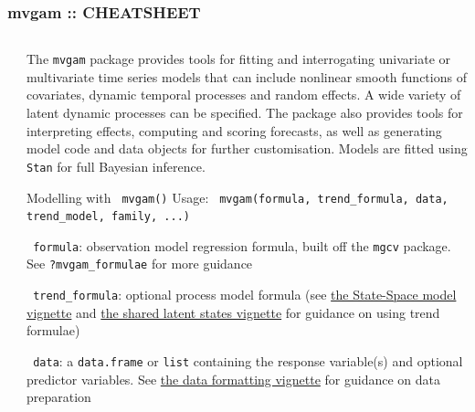 \documentclass[final,9pt,fleqn]{beamer}\usepackage[]{graphicx}\usepackage[]{xcolor}
\begin{document}
\begin{frame}[fragile]
  \frametitle{{\fontsize{41}{43} \selectfont \textcolor{mygray}{mvgam ::}} {\fontsize{25}{25} \textbf{\textcolor{mygray}{CHEATSHEET}}}}
\vspace{-0.6in}
  \begin{columns}
    \begin{column}{0.02\paperwidth} %
    \end{column}

    \begin{column}{0.3\paperwidth}

\begin{block}
\noindent\makebox[\linewidth]{\rule{0.3\paperwidth}{0.2pt}}

The \texttt{mvgam} package provides tools for fitting and interrogating univariate or multivariate time series models that can include nonlinear smooth functions of covariates, dynamic temporal processes and random effects. A wide variety of latent dynamic processes can be specified. The package also provides tools for interpreting effects, computing and scoring forecasts, as well as generating model code and data objects for further customisation. Models are fitted using \texttt{Stan} for full Bayesian inference.

\end{block}

\begin{block}{{\fontsize{21}{21} \selectfont \color{BrickRed} Modelling with \texttt{\color{Orchid} mvgam()}}}
Usage: \texttt{\color{Orchid} mvgam(formula, trend\_formula, data, trend\_model, family, ...)}

\medskip
\texttt{\color{Orchid} formula}: observation model regression formula, built off the \texttt{mgcv} package. See \texttt{\color{Orchid}?mvgam\_formulae} for more guidance

\medskip
\texttt{\color{Orchid} trend\_formula}: optional process model formula (see \href{https://nicholasjclark.github.io/mvgam/articles/trend_formulas.html}{the State-Space model vignette} and \href{https://nicholasjclark.github.io/mvgam/articles/trend_formulas.html}{the shared latent states vignette} for guidance on using trend formulae)

\medskip
\texttt{\color{Orchid} data}: a \texttt{data.frame} or \texttt{list} containing the response variable(s) and optional predictor variables. See \href{https://nicholasjclark.github.io/mvgam/articles/data_in_mvgam.html}{the data formatting vignette} for guidance on data preparation


\end{block}
\end{column}
\end{columns}
\end{frame}
\end{document}
